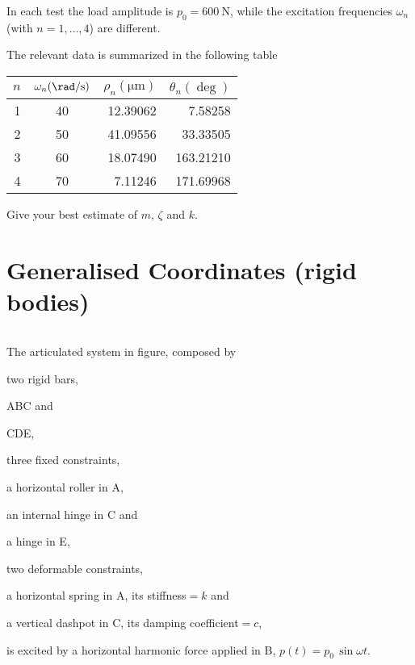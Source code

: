 \documentclass[11pt,a4paper]{article}
\newenvironment{enumin}%
   {\begin{inparaenum}[\hspace{0.6em}(1)]}%
   {\end{inparaenum}}
\begin{document}
In each test the load amplitude is $p_0=\SI{600}{\newton}$, while
the excitation frequencies $\omega_n$ (with $n=1,\ldots,4$) are
different.

The relevant data is summarized in the following table
\begin{center}
  \begin{tabular}{rcrr}
    \toprule 
    $n$ & 
    $\omega_n (\si{\rad\per\second})$ & 
    $\rho_n (\si{\micro\metre})$  &
    $\theta_n (\si{\deg})$\\
    \midrule
    1 & 40 & 12.39062 &   7.58258 \\
    2 & 50 & 41.09556 &  33.33505 \\
    3 & 60 & 18.07490 & 163.21210 \\
    4 & 70 &  7.11246 & 171.69968 \\
    \bottomrule
  \end{tabular}
\end{center}
Give your best estimate of $m$, $\zeta$ and $k$.
\section{Generalised Coordinates (rigid bodies)}

\[\]

\noindent The articulated system in figure, composed by
\begin{itemize}
\item two rigid bars, \begin{enumin}\item \textsf{ABC} and
  \item\textsf{CDE},
  \end{enumin}
\item three fixed constraints,
  \begin{enumin}
  \item a horizontal roller in \textsf{A},
  \item an internal hinge in \textsf{C} and
  \item a hinge in \textsf{E},
  \end{enumin}
\item two deformable constraints,
  \begin{enumin}
  \item a horizontal spring in \textsf{A}, its stiffness${}=k$ and
  \item a vertical dashpot in \textsf{C}, its damping
    coefficient${}=c$,
  \end{enumin}
\end{itemize}
is excited by a horizontal harmonic  force applied in \textsf{B},
\(p(t)=p_0\,\sin\omega t.\)
\end{document}
